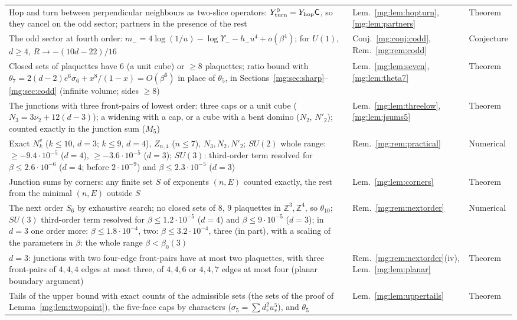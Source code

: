 \documentclass[11pt,a4paper]{article}
\theoremstyle{definition}
\theoremstyle{remark}
\newcommand{\Z}{\mathbb{Z}}
\begin{document}
\begin{longtable}{@{}p{}p{}p{}@{}}
Hop and turn between perpendicular neighbours as two-slice operators: $Y^0_{\rm turn}=Y_{\rm hop}\mathsf C$, so they cancel on the odd sector; partners in the presence of the rest & Lem.~\ref{mg:lem:hopturn}, \ref{mg:lem:partners} & Theorem\\
The odd sector at fourth order: $m_-=4\log(1/u)-\log\Upsilon_--h_-u^4+o(\beta^4)$; for $U(1)$, $d\ge4$, $R\to-(10d-22)/16$ & Conj.~\ref{mg:conj:codd}, Rem.~\ref{mg:rem:codd} & Conjecture\\
Closed sets of plaquettes have $6$ (a unit cube) or $\ge8$ plaquettes; ratio bound with $\theta_7=2(d-2)e^6\sigma_6+x^8/(1-x)=O(\beta^6)$ in place of $\theta_5$, in Sections~\ref{mg:sec:sharp}--\ref{mg:sec:codd} (infinite volume; sides $\ge8$) & Lem.~\ref{mg:lem:seven}, \ref{mg:lem:theta7} & Theorem\\
The junctions with three front-pairs of lowest order: three caps or a unit cube ($N_3=3\nu_2+12(d-3)$); a widening with a cap, or a cube with a bent domino ($N_2$, $N'_2$); counted exactly in the junction sum ($M_5$) & Lem.~\ref{mg:lem:threelow}, \ref{mg:lem:jsums5} & Theorem\\
Exact $N^v_k$ ($k\le10$, $d=3$; $k\le9$, $d=4$), $Z_{n,4}$ ($n\le7$), $N_3,N_2,N'_2$; $SU(2)$ whole range: $\ge-9.4\cdot10^{-5}$ ($d=4$), $\ge-3.6\cdot10^{-5}$ ($d=3$); $SU(3)$: third-order term resolved for $\beta\le2.6\cdot10^{-6}$ ($d=4$; before $2\cdot10^{-9}$) and $\beta\le2.3\cdot10^{-5}$ ($d=3$) & Rem.~\ref{mg:rem:practical} & Numerical\\
Junction sums by corners: any finite set $S$ of exponents $(n,E)$ counted exactly, the rest from the minimal $(n,E)$ outside $S$ & Lem.~\ref{mg:lem:corners} & Theorem\\
The next order $S_6$ by exhaustive search; no closed sets of $8$, $9$ plaquettes in $\Z^3,\Z^4$, so $\theta_{10}$; $SU(3)$ third-order term resolved for $\beta\le1.2\cdot10^{-5}$ ($d=4$) and $\beta\le9\cdot10^{-5}$ ($d=3$); in $d=3$ one order more: $\beta\le1.8\cdot10^{-4}$, two: $\beta\le3.2\cdot10^{-4}$, three (in part), with a scaling of the parameters in $\beta$: the whole range $\beta<\beta_0(3)$ & Rem.~\ref{mg:rem:nextorder} & Numerical\\
$d=3$: junctions with two four-edge front-pairs have at most two plaquettes, with three front-pairs of $4,4,4$ edges at most three, of $4,4,6$ or $4,4,7$ edges at most four (planar boundary argument) & Rem.~\ref{mg:rem:nextorder}(iv), Lem.~\ref{mg:lem:planar} & Theorem\\
Tails of the upper bound with exact counts of the admissible sets (the sets of the proof of Lemma~\ref{mg:lem:twopoint}), the five-face caps by characters ($\sigma_5=\sum d_r^2u_r^5$), and $\theta_5$ & Lem.~\ref{mg:lem:uppertails} & Theorem\\

\end{longtable}
\end{document}
